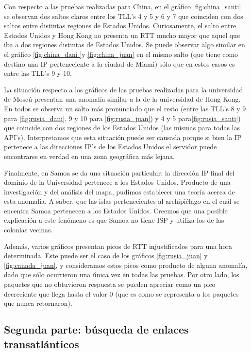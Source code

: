 Con respecto a las pruebas realizadas para China, en el gráfico \ref{fig:china_santi} se observan dos saltos claros entre los TLL's 4 y 5 y 6 y 7 que coinciden con dos saltos entre distintas regiones de Estados Unidos. Curiosamente, el salto entre Estados Unidos y Hong Kong no presenta un RTT mucho mayor que aquel que iba a dos regiones distintas de Estados Unidos. Se puede observar algo similar en el gráfico \ref{fig:china_dani }y \ref{fig:china_juan} en el mismo salto (que tiene como destino una IP perteneciente a la ciudad de Miami) sólo que en estos casos es entre las TLL's 9 y 10.

La situación respecto a los gráficos de las pruebas realizadas para la universidad de Moscú presentan una anomalía similar a la de la universidad de Hong Kong. En todos se observa un salto más pronunciado que el resto (entre las TLL's 8 y 9 para \ref{fig:rusia_dani}, 9 y 10 para \ref{fig:rusia_juan}) y 4 y 5 para\ref{fig:rusia_santi}) que coincide con dos regiones de los Estados Unidos (las mismas para todas las API's). Interpretamos que esta situación puede ser causada porque si bien la IP pertenece a las direcciones IP's de los Estados Unidos el servidor puede encontrarse en verdad en una zona geográfica más lejana.

 Finalmente, en Samoa se da una situación particular: la dirección IP final del dominio de la Universidad pertenece a los Estados Unidos. Producto de una investigación y del análisis del mapa, pudimos establecer una teoría acerca de esta anomalía. A saber, que las islas pertenecientes al archipiélago en el cuál se encentra Samoa pertenecen a los Estados Unidos. Creemos que una posible explicación a este fenómeno es que Samoa no tiene ISP y utiliza los de las colonias vecinas.

Además, varios gráficos presentan picos de RTT injustificados para una hora determinada. Este puede ser el caso de los gráficos \ref{fig:rusia_juan} y \ref{fig:canada_juan}, y consideramos estos picos como producto de alguna anomalía, dado que sólo ocurrieron una única vez en todas las pruebas. Por otro lado, los paquetes que no obtuvieron respuesta se pueden apreciar como un pico decreciente que llega hasta el valor 0 (que es como se representa a los paquetes que nunca retornaron).


\subsection{Segunda parte: búsqueda de enlaces transatlánticos}

